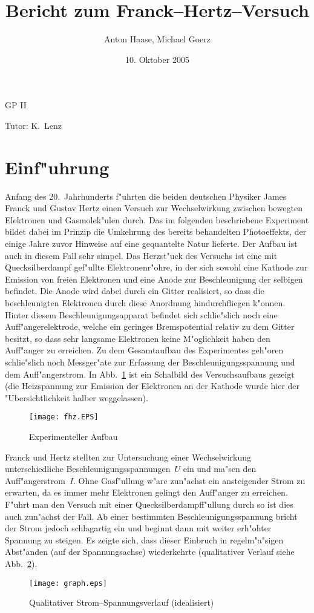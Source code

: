 \documentclass[a4paper,10pt]{article}
\title{Bericht zum Franck--Hertz--Versuch}
\author{Anton Haase, Michael Goerz}
\date{10. Oktober 2005}
\begin{document}
\maketitle
\noindent GP II

\noindent Tutor: K.~Lenz

\section{Einf"uhrung}
Anfang des 20.~Jahrhunderts f"uhrten die beiden deutschen Physiker James Franck und Gustav Hertz einen Versuch zur Wechselwirkung zwischen bewegten Elektronen und Gasmolek"ulen durch. Das im folgenden beschriebene Experiment bildet dabei im Prinzip die Umkehrung des bereits behandelten Photoeffekts, der einige Jahre zuvor Hinweise auf eine gequantelte Natur lieferte. Der Aufbau ist auch in diesem Fall sehr simpel. Das Herzst"uck des Versuchs ist eine mit Quecksilberdampf gef"ullte Elektronenr"ohre, in der sich sowohl eine Kathode zur Emission von freien Elektronen und eine Anode zur Beschleunigung der selbigen befindet. Die Anode wird dabei durch ein Gitter realisiert, so dass die beschleunigten Elektronen durch diese Anordnung hindurchfliegen k"onnen. Hinter diesem Beschleunigungsapparat befindet sich schlie"slich noch eine Auff"angerelektrode, welche ein geringes Bremspotential relativ zu dem Gitter besitzt, so dass sehr langsame Elektronen keine M"oglichkeit haben den Auff"anger zu erreichen. Zu dem Gesamtaufbau des Experimentes geh"oren schlie"slich noch Messger"ate zur Erfassung der Beschleunigungsspannung und dem Auff"angerstrom. In Abb.~\ref{roehre} ist ein Schalbild des Versuchsaufbaus gezeigt (die Heizspannung zur Emission der Elektronen an der Kathode wurde hier der "Ubersichtlichkeit halber weggelassen).
\begin{figure}[ht]
	\centering
	\texttt{[image: fhz.EPS]}
	\caption{Experimenteller Aufbau}
	\label{roehre}
\end{figure}

Franck und Hertz stellten zur Untersuchung einer Wechselwirkung unterschiedliche Beschleunigungsspannungen~$U$ ein und ma"sen den Auff"angerstrom~$I$. Ohne Gasf"ullung w"are zun"achst ein ansteigender Strom zu erwarten, da es immer mehr Elektronen gelingt den Auff"anger zu erreichen. F"uhrt man den Versuch mit einer Quecksilberdampff"ullung durch so ist dies auch zun"achst der Fall. Ab einer bestimmten Beschleunigungsspannung bricht der Strom jedoch schlagartig ein und beginnt dann mit weiter erh"ohter Spannung zu steigen. Es zeigte sich, dass dieser Einbruch in regelm"a"sigen Abst"anden (auf der Spannungsachse) wiederkehrte (qualitativer Verlauf siehe Abb.~\ref{qual}).
\begin{figure}[ht]
	\centering
	\texttt{[image: graph.eps]}
	\caption{Qualitativer Strom--Spannungsverlauf (idealisiert)}
	\label{qual}
\end{figure}
\end{document}

